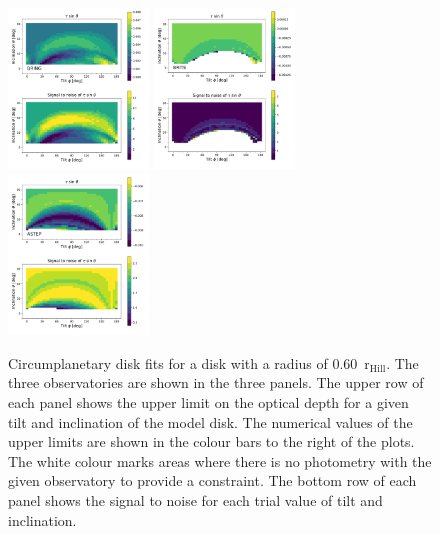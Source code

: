 \documentclass[longauth]{aa} %
\newcommand{\rhill}{$\mathrm{r_{Hill}}$} %
\begin{document}
\begin{figure}[htb]
    \includegraphics[width=0.333\textwidth]{diskfit_BRING_060.pdf}
    \includegraphics[width=0.333\textwidth]{diskfit_BRITE_060.pdf}
    \includegraphics[width=0.333\textwidth]{diskfit_ASTEP_060.pdf}
    \caption{Circumplanetary disk fits for a disk with a radius of 0.60\ \rhill. The three observatories are shown in the three panels. The upper row of each panel shows the upper limit on the optical depth for a given tilt and inclination of the model disk. The numerical values of the upper limits are shown in the colour bars to the right of the plots. The white colour marks areas where there is no photometry with the given observatory to provide a constraint. The bottom row of each panel shows the signal to noise for each trial value of tilt and inclination.}
    \label{cpd60}
\end{figure}
\end{document}
